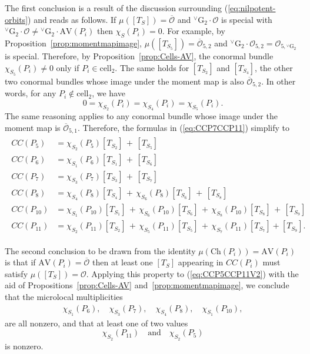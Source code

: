 \documentclass[a4paper, 11pt]{article}
\begin{document}
The first conclusion is a result of the discussion surrounding
(\ref{eq:nilpotent-orbits}) and reads as follows.
If $\mu([T_{S}]) = \overline{\mathcal{O}}$ and
${}^{\vee}\mathrm{G}_{2} \cdot \mathcal{O}$ is special with
${}^{\vee}\mathrm{G}_{2} \cdot \mathcal{O} \neq   
{}^{\vee}\mathrm{G}_{2} \cdot \mathrm{AV}(P_{i})$ then $\chi_{S}(P_{i}) =
0$.
For example, by Proposition~\ref{prop:momentmapimage}, $\mu([T_{S_5}])
= \overline{\mathcal{O}}_{5,2}$ and ${^\vee}\mathrm{G}_{2}\cdot
\mathcal{O}_{5,2} = \mathcal{O}_{5,{^\vee}\mathrm{G}_{2}}$ is special. Therefore, by
Proposition~\ref{prop:Cells-AV}, the conormal bundle
$\chi_{S_{5}}(P_{i}) \neq 0$  only if $P_i \in \mathrm{cell}_2$. 
The same holds for $[T_{S_2}]$ and $[T_{S_4}]$, the other two conormal
bundles whose image under the moment map is also
$\overline{\mathcal{O}}_{5,2}$. 
In other words, for any $P_i \notin \mathrm{cell}_2$, we have 
$$
0=\chi_{S_2}(P_i)=\chi_{S_4}(P_i)=\chi_{S_5}(P_i).
$$
The same reasoning applies to any conormal bundle whose image under
the moment map is $\overline{\mathcal{O}}_{5,1}$. Therefore, the
formulas in (\ref{eq:CCP7CCP11}) simplify to 
\begin{align}\label{eq:CCP5CCP11V2}
\begin{aligned}
CC(P_5)&=\chi^{}_{S_2}(P_5)[T_{S_2}]\, +\, 
[T_{S_5}]\\
CC(P_6)&=\chi^{}_{S_1}(P_6)[T_{S_1}]\, +\, 
[T_{S_6}]\\
CC(P_7)&= \chi^{}_{S_3}(P_7) [T_{S_3}]
\, +\, [T_{S_7}]\\
CC(P_8)&= \chi^{}_{S_4}(P_8)[T_{S_4}]\, +\, 
\chi^{}_{S_6}(P_8)[T_{S_6}]\, +\, [T^{}_{S_8}]\\
CC(P_{10})&=\chi^{}_{S_1}(P_{10})[T_{S_1}]\,+\, 
\chi^{}_{S_6}(P_{10})[T_{S_6}]
\, +\, \chi^{}_{S_8}(P_{10}) [T_{S_8}]\, +\, [T_{S_9}]\\
CC(P_{11})&=\chi^{}_{S_2}(P_{11})[T_{S_2}]\, +\,
\chi^{}_{S_5}(P_{11})[T_{S_5}]\, +\,
\chi^{}_{S_7}(P_{11})[T_{S_7}]+[T_{S_9}]. 
\end{aligned}
\end{align}

The second conclusion to be drawn from the identity $\mu(\mathrm{Ch}(P_i)) =
\mathrm{AV}(P_i)$  is that if $\mathrm{AV}(P_{i}) = \overline{\mathcal{O}}$ then
at least one $[T_{S}]$ appearing in $CC(P_{i})$ must satisfy
$\mu([T_{S}]) = \mathcal{O}$.  Applying this property to
(\ref{eq:CCP5CCP11V2}) with the aid of
Propositions~\ref{prop:Cells-AV} and~\ref{prop:momentmapimage}, we
conclude that the microlocal multiplicities 
\begin{align}\label{eq:nonzeromicro} 
\chi_{S_1}(P_6),\quad \chi_{S_3}(P_7),\quad \chi_{S_4}(P_8),\quad 
\chi_{S_1}(P_{10}),
\end{align}
are all nonzero, and that at least one of two values
\[
\chi_{S_2}(P_{11}) \quad \text{and} \quad \chi_{S_2}(P_{5})
\]
is nonzero.
\end{document}
